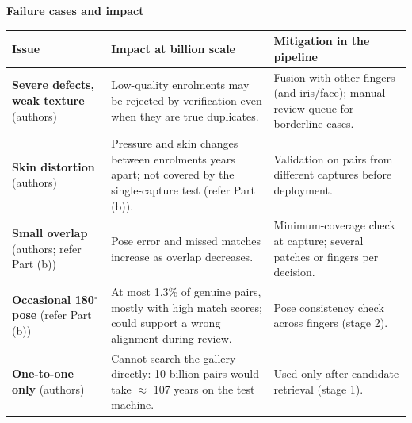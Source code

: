 \documentclass[10pt,a4paper]{article}
\begin{document}
\textbf{Failure cases and impact}\par
\begin{tabularx}{\textwidth}{@{}>{\raggedright}p{3.4cm}>{\raggedright}X>{\raggedright\arraybackslash}X@{}}\toprule
\textbf{Issue} & \textbf{Impact at billion scale} & \textbf{Mitigation in the pipeline}\\\midrule
\textbf{Severe defects, weak texture} (authors) & Low-quality enrolments may be rejected by verification even when they are true duplicates. & Fusion with other fingers (and iris/face); manual review queue for borderline cases.\\\midrule
\textbf{Skin distortion} (authors) & Pressure and skin changes between enrolments years apart; not covered by the single-capture test (refer Part (b)). & Validation on pairs from different captures before deployment.\\\midrule
\textbf{Small overlap} (authors; refer Part (b)) & Pose error and missed matches increase as overlap decreases. & Minimum-coverage check at capture; several patches or fingers per decision.\\\midrule
\textbf{Occasional 180$^\circ$ pose} (refer Part (b)) & At most 1.3\% of genuine pairs, mostly with high match scores; could support a wrong alignment during review. & Pose consistency check across fingers (stage 2).\\\midrule
\textbf{One-to-one only} (authors) & Cannot search the gallery directly: 10 billion pairs would take $\approx$ 107 years on the test machine. & Used only after candidate retrieval (stage 1).\\\bottomrule\end{tabularx}
\end{document}
